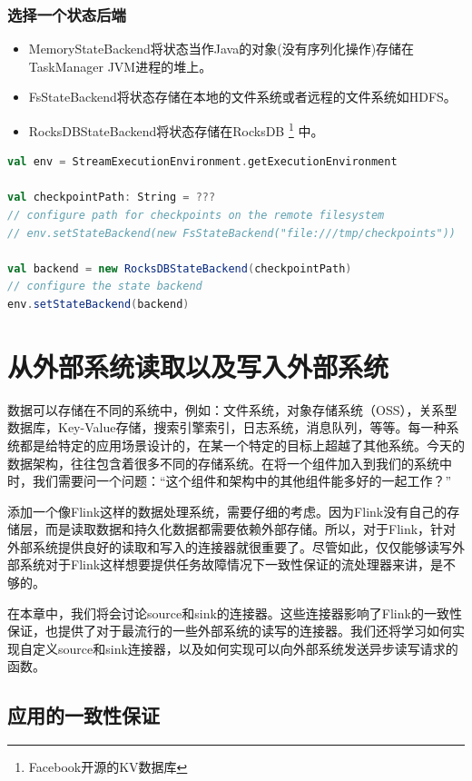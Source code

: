 \documentclass[oneside]{ctexbook}
\begin{document}
\subsection{选择一个状态后端}

\begin{itemize}
\item MemoryStateBackend将状态当作Java的对象(没有序列化操作)存储在TaskManager JVM进程的堆上。
\item FsStateBackend将状态存储在本地的文件系统或者远程的文件系统如HDFS。
\item RocksDBStateBackend将状态存储在RocksDB \footnote{Facebook开源的KV数据库} 中。
\end{itemize}

\begin{lstlisting}[language=scala]
val env = StreamExecutionEnvironment.getExecutionEnvironment

val checkpointPath: String = ???
// configure path for checkpoints on the remote filesystem
// env.setStateBackend(new FsStateBackend("file:///tmp/checkpoints"))

val backend = new RocksDBStateBackend(checkpointPath)
// configure the state backend
env.setStateBackend(backend)
\end{lstlisting}

\chapter{从外部系统读取以及写入外部系统}

数据可以存储在不同的系统中，例如：文件系统，对象存储系统（OSS），关系型数据库，Key-Value存储，搜索引擎索引，日志系统，消息队列，等等。每一种系统都是给特定的应用场景设计的，在某一个特定的目标上超越了其他系统。今天的数据架构，往往包含着很多不同的存储系统。在将一个组件加入到我们的系统中时，我们需要问一个问题：“这个组件和架构中的其他组件能多好的一起工作？”

添加一个像Flink这样的数据处理系统，需要仔细的考虑。因为Flink没有自己的存储层，而是读取数据和持久化数据都需要依赖外部存储。所以，对于Flink，针对外部系统提供良好的读取和写入的连接器就很重要了。尽管如此，仅仅能够读写外部系统对于Flink这样想要提供任务故障情况下一致性保证的流处理器来讲，是不够的。

在本章中，我们将会讨论source和sink的连接器。这些连接器影响了Flink的一致性保证，也提供了对于最流行的一些外部系统的读写的连接器。我们还将学习如何实现自定义source和sink连接器，以及如何实现可以向外部系统发送异步读写请求的函数。

\section{应用的一致性保证}
\end{document}
